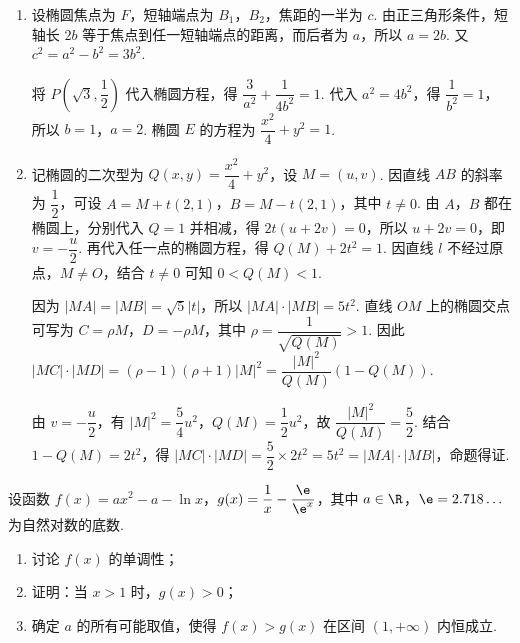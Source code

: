 \begin{solution}
\begin{enumerate}
\item 设椭圆焦点为 \(F\)，短轴端点为 \(B_1\)，\(B_2\)，焦距的一半为 \(c\). 由正三角形条件，短轴长 \(2b\) 等于焦点到任一短轴端点的距离，而后者为 \(a\)，所以 \(a=2b\). 又 \(c^2=a^2-b^2=3b^2\).

将 \(P\left(\sqrt3,\dfrac12\right)\) 代入椭圆方程，得 \(\dfrac{3}{a^2}+\dfrac{1}{4b^2}=1\). 代入 \(a^2=4b^2\)，得 \(\dfrac{1}{b^2}=1\)，所以 \(b=1\)，\(a=2\). 椭圆 \(E\) 的方程为 \(\dfrac{x^2}{4}+y^2=1\).
\item 记椭圆的二次型为 \(Q(x,y)=\dfrac{x^2}{4}+y^2\)，设 \(M=(u,v)\). 因直线 \(AB\) 的斜率为 \(\dfrac12\)，可设 \(A=M+t(2,1)\)，\(B=M-t(2,1)\)，其中 \(t\neq0\). 由 \(A\)，\(B\) 都在椭圆上，分别代入 \(Q=1\) 并相减，得 \(2t(u+2v)=0\)，所以 \(u+2v=0\)，即 \(v=-\dfrac u2\). 再代入任一点的椭圆方程，得 \(Q(M)+2t^2=1\). 因直线 \(l\) 不经过原点，\(M\ne O\)，结合 \(t\ne0\) 可知 \(0<Q(M)<1\).

因为 \(|MA|=|MB|=\sqrt5|t|\)，所以 \(|MA|\cdot|MB|=5t^2\). 直线 \(OM\) 上的椭圆交点可写为 \(C=\rho M\)，\(D=-\rho M\)，其中 \(\rho=\dfrac1{\sqrt{Q(M)}}>1\). 因此 \(|MC|\cdot|MD|=(\rho-1)(\rho+1)|M|^2=\dfrac{|M|^2}{Q(M)}\left(1-Q(M)\right)\).

由 \(v=-\dfrac u2\)，有 \(|M|^2=\dfrac54u^2\)，\(Q(M)=\dfrac12u^2\)，故 \(\dfrac{|M|^2}{Q(M)}=\dfrac52\). 结合 \(1-Q(M)=2t^2\)，得 \(|MC|\cdot|MD|=\dfrac52\times2t^2=5t^2=|MA|\cdot|MB|\)，命题得证.
\end{enumerate}
\end{solution}

\begin{problem}
设函数 \(f(x)=ax^2-a-\ln x\)，\(g(x)=\dfrac1x-\dfrac{\e}{\e^x}\)，其中 \(a\in\R\)，\(\e=2.718\ldots\) 为自然对数的底数.

\begin{enumerate}
\item 讨论 \(f(x)\) 的单调性；
\item 证明：当 \(x>1\) 时，\(g(x)>0\)；
\item 确定 \(a\) 的所有可能取值，使得 \(f(x)>g(x)\) 在区间 \((1,+\infty)\) 内恒成立.
\end{enumerate}
\end{problem}

